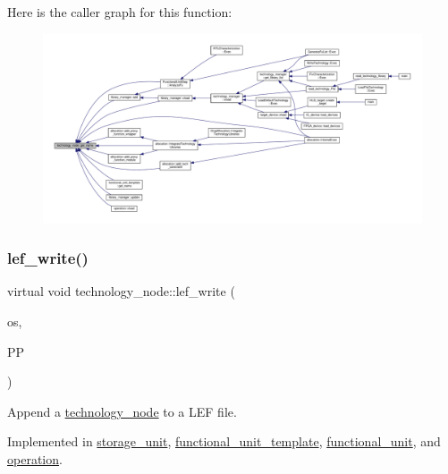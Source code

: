 Here is the caller graph for this function\+:
\nopagebreak
\begin{figure}[H]
\begin{center}
\leavevmode
\includegraphics[width=350pt]{df/d06/structtechnology__node_ade1d568637cfe8de91fc732fba4d62d5_icgraph}
\end{center}
\end{figure}
\mbox{\label{structtechnology__node_a2a92a701dec7c32a6bee6f66576f1fc6}} 
\subsubsection{\texorpdfstring{lef\+\_\+write()}{lef\_write()}}
{\footnotesize\ttfamily virtual void technology\+\_\+node\+::lef\+\_\+write (\begin{DoxyParamCaption}\item[{std\+::ofstream \&}]{os,  }\item[{const \hyperlink{simple__indent_8hpp_ad85cff64e49d5dbf5cefe96f411c720e}{simple\+\_\+indent\+Ref}}]{PP }\end{DoxyParamCaption})\hspace{0.3cm}{\ttfamily [pure virtual]}}



Append a \hyperlink{structtechnology__node}{technology\+\_\+node} to a L\+EF file. 



Implemented in \hyperlink{structstorage__unit_a444c9109c8a40618702dba1fa86b05dc}{storage\+\_\+unit}, \hyperlink{structfunctional__unit__template_a9dfb2331936da0d6c56ac8e80312b95b}{functional\+\_\+unit\+\_\+template}, \hyperlink{structfunctional__unit_a3e77b0b684c72195d55d1aa2144641c1}{functional\+\_\+unit}, and \hyperlink{structoperation_aa6451ee75f5e5db619448ae294fc85d3}{operation}.



